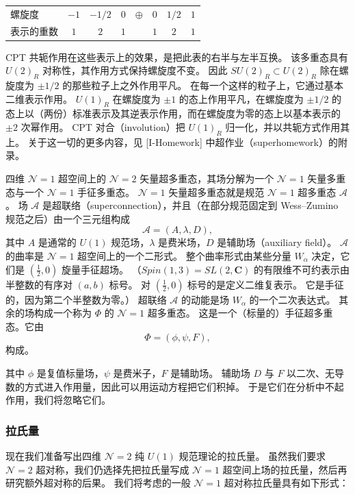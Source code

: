 \begin{center}
\begin{tabular}{lccccccc}
\toprule
螺旋度 & $-1$ & $-1/2$ & $0$ & $\oplus$ & $0$ & $1/2$ & $1$\\
表示的重数 & $1$ & $2$ & $1$ & & $1$ & $2$ & $1$\\
\bottomrule
\end{tabular}
\end{center}

CPT 共轭作用在这些表示上的效果，是把此表的右半与左半互换。
该多重态具有 $U(2)_R$ 对称性，其作用方式保持螺旋度不变。
因此 $SU(2)_R\subset U(2)_R$ 除在螺旋度为 $\pm1/2$ 的那些粒子上之外作用平凡。
在每一个这样的粒子上，它通过基本二维表示作用。
$U(1)_R$ 在螺旋度为 $\pm1$ 的态上作用平凡，在螺旋度为 $\pm1/2$ 的态上以（两份）标准表示及其逆表示作用，而在螺旋度为零的态上以基本表示的 $\pm2$ 次幂作用。
CPT 对合（involution）把 $U(1)_R$ 归一化，并以共轭方式作用其上。
关于这一切的更多内容，见 [I-Homework] 中超作业（superhomework）的附录。

四维 $\mathcal{N}=1$ 超空间上的 $\mathcal{N}=2$ 矢量超多重态，其场分解为一个 $\mathcal{N}=1$ 矢量多重态与一个 $\mathcal{N}=1$ 手征多重态。
$\mathcal{N}=1$ 矢量超多重态就是规范 $\mathcal{N}=1$ 超多重态 $\mathcal{A}$。
场 $\mathcal{A}$ 是超联络（superconnection），并且（在部分规范固定到 Wess--Zumino 规范之后）由一个三元组构成
\[
\mathcal{A}=(A,\lambda,D),
\]
其中 $A$ 是通常的 $U(1)$ 规范场，$\lambda$ 是费米场，$D$ 是辅助场（auxiliary field）。
$\mathcal{A}$ 的曲率是 $\mathcal{N}=1$ 超空间上的一个二形式。
整个曲率形式由某些分量 $W_\alpha$ 决定，它们是 $(\tfrac12,0)$ 旋量手征超场。
（$Spin(1,3)=SL(2,\mathbf{C})$ 的有限维不可约表示由半整数的有序对 $(a,b)$ 标号。
对 $(\tfrac12,0)$ 标号的是定义二维复表示。
它是手征的，因为第二个半整数为零。）
超联络 $\mathcal{A}$ 的动能是场 $W_\alpha$ 的一个二次表达式。
其余的场构成一个称为 $\Phi$ 的 $\mathcal{N}=1$ 超多重态。
这是一个（标量的）手征超多重态。它由
\[
\Phi=(\phi,\psi,F),
\]
构成。


其中 $\phi$ 是复值标量场，$\psi$ 是费米子，$F$ 是辅助场。
辅助场 $D$ 与 $F$ 以二次、无导数的方式进入作用量，因此可以用运动方程把它们积掉。
于是它们在分析中不起作用，我们将忽略它们。

\subsubsection{拉氏量}

现在我们准备写出四维 $\mathcal{N}=2$ 纯 $U(1)$ 规范理论的拉氏量。
虽然我们要求 $\mathcal{N}=2$ 超对称，我们仍选择先把拉氏量写成 $\mathcal{N}=1$ 超空间上场的拉氏量，然后再研究额外超对称的后果。
我们将考虑的一般 $\mathcal{N}=1$ 超对称拉氏量具有如下形式：

